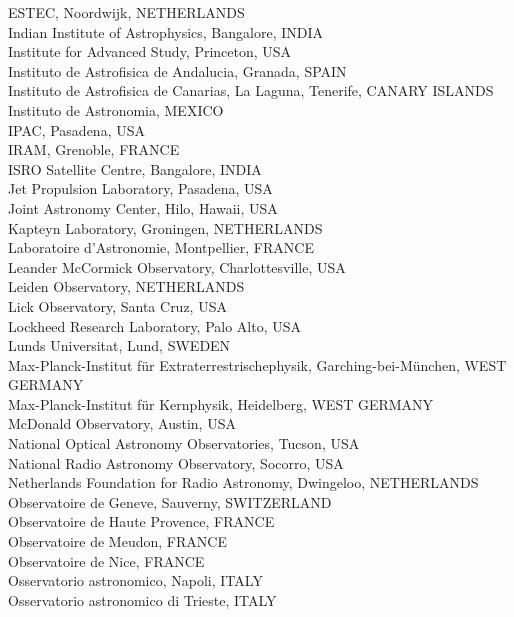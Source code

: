 \begin{tabbing}
\>ESTEC, Noordwijk, NETHERLANDS\\
\>Indian Institute of Astrophysics, Bangalore, INDIA\\
\>Institute for Advanced Study, Princeton, USA\\
\>Instituto de Astrofisica de Andalucia, Granada, SPAIN\\
\>Instituto de Astrofisica de Canarias, La Laguna, Tenerife, CANARY ISLANDS\\
\>Instituto de Astronomia, MEXICO\\
\>IPAC, Pasadena, USA\\
\>IRAM, Grenoble, FRANCE\\
\>ISRO Satellite Centre, Bangalore, INDIA\\
\>Jet Propulsion Laboratory, Pasadena, USA\\
\>Joint Astronomy Center, Hilo, Hawaii, USA\\
\>Kapteyn Laboratory, Groningen, NETHERLANDS\\
\>Laboratoire d'Astronomie, Montpellier, FRANCE\\
\>Leander McCormick Observatory, Charlottesville, USA\\
\>Leiden Observatory, NETHERLANDS\\
\>Lick Observatory, Santa Cruz, USA\\
\>Lockheed Research Laboratory, Palo Alto, USA\\
\>Lunds Universitat, Lund, SWEDEN\\
\>Max-Planck-Institut f\"{u}r Extraterrestrischephysik, Garching-bei-M\"{u}nchen, WEST GERMANY\\
\>Max-Planck-Institut f\"{u}r Kernphysik, Heidelberg, WEST GERMANY\\
\>McDonald Observatory, Austin, USA\\
\>National Optical Astronomy Observatories, Tucson, USA\\
\>National Radio Astronomy Observatory, Socorro, USA\\
\>Netherlands Foundation for Radio Astronomy, Dwingeloo, NETHERLANDS\\
\>Observatoire de Geneve, Sauverny, SWITZERLAND\\
\>Observatoire de Haute Provence, FRANCE\\
\>Observatoire de Meudon, FRANCE\\
\>Observatoire de Nice, FRANCE\\
\>Osservatorio astronomico, Napoli, ITALY\\
\>Osservatorio astronomico di Trieste, ITALY\\

\end{tabbing}
